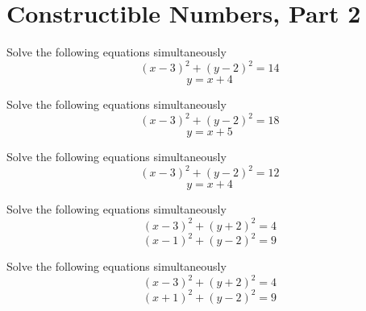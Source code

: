 \newpage
\section{Constructible Numbers, Part 2}

\begin{prob}
Solve the following equations simultaneously
$$(x-3)^2+(y-2)^2 = 14$$
$$ y = x + 4$$
\end{prob}


\begin{prob}
Solve the following equations simultaneously
$$(x-3)^2+(y-2)^2 = 18$$
$$ y = x + 5$$
\end{prob}

\begin{prob}
Solve the following equations simultaneously
$$(x-3)^2+(y-2)^2 = 12$$
$$ y = x + 4$$
\end{prob}


\begin{prob}
Solve the following equations simultaneously
$$(x-3)^2+(y+2)^2 = 4$$
$$(x-1)^2+(y-2)^2 = 9$$
\end{prob}

\begin{prob}
Solve the following equations simultaneously
$$(x-3)^2+(y+2)^2 = 4$$
$$(x+1)^2+(y-2)^2 = 9$$
\end{prob}

